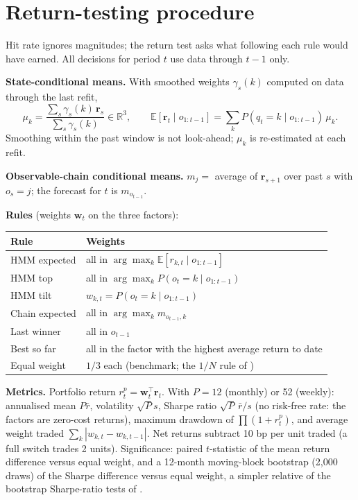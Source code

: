 \documentclass[11pt]{article}
\begin{document}
\section{Return-testing procedure}\label{sec:returnsmethod}

Hit rate ignores magnitudes; the return test asks what following each rule would have earned. All decisions for period $t$ use data through $t-1$ only.

\textbf{State-conditional means.} With smoothed weights $\gamma_s(k)$ computed on data through the last refit,
\[
\mu_k=\frac{\sum_s\gamma_s(k)\,\mathbf r_s}{\sum_s\gamma_s(k)}\in\mathbb R^3,
\qquad
\mathbb E[\mathbf r_t\mid o_{1:t-1}]=\sum_k P(q_t=k\mid o_{1:t-1})\,\mu_k .
\]
Smoothing within the past window is not look-ahead; $\mu_k$ is re-estimated at each refit.

\textbf{Observable-chain conditional means.} $m_j=$ average of $\mathbf r_{s+1}$ over past $s$ with $o_s=j$; the forecast for $t$ is $m_{o_{t-1}}$.

\textbf{Rules} (weights $\mathbf w_t$ on the three factors):
\begin{center}
\begin{tabularx}{\textwidth}{@{}lX@{}}
\toprule
Rule & Weights \\
\midrule
HMM expected & all in $\arg\max_k \mathbb E[r_{k,t}\mid o_{1:t-1}]$ \\
HMM top & all in $\arg\max_k P(o_t=k\mid o_{1:t-1})$ \\
HMM tilt & $w_{k,t}=P(o_t=k\mid o_{1:t-1})$ \\
Chain expected & all in $\arg\max_k m_{o_{t-1},k}$ \\
Last winner & all in $o_{t-1}$ \\
Best so far & all in the factor with the highest average return to date \\
Equal weight & $1/3$ each (benchmark; the $1/N$ rule of \citealp{demiguel2009}) \\
\bottomrule
\end{tabularx}
\end{center}

\textbf{Metrics.} Portfolio return $r^p_t=\mathbf w_t^\top\mathbf r_t$. With $P=12$ (monthly) or 52 (weekly): annualised mean $P\bar r$, volatility $\sqrt P s$, Sharpe ratio $\sqrt P\,\bar r/s$ \citep{sharpe1994} (no risk-free rate: the factors are zero-cost returns), maximum drawdown of $\prod(1+r^p_t)$, and average weight traded $\sum_k|w_{k,t}-w_{k,t-1}|$. Net returns subtract 10 bp per unit traded (a full switch trades 2 units). Significance: paired $t$-statistic of the mean return difference versus equal weight, and a 12-month moving-block bootstrap \citep{kunsch1989} (2{,}000 draws) of the Sharpe difference versus equal weight, a simpler relative of the bootstrap Sharpe-ratio tests of \citet{ledoit2008}.
\end{document}
